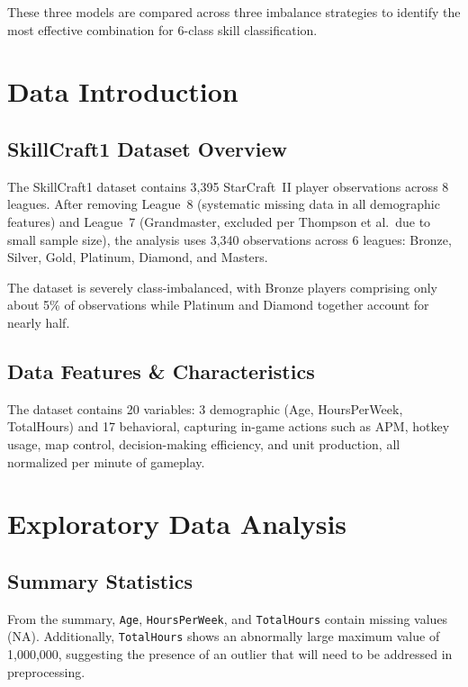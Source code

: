 \documentclass[12pt, a4paper]{article}
\begin{document}
These three models are compared across three imbalance strategies to identify the
most effective combination for 6-class skill classification.


\section{Data Introduction}

\subsection{SkillCraft1 Dataset Overview}

The SkillCraft1 dataset contains 3,395 StarCraft~II player observations across 8
leagues. After removing League~8 (systematic missing data in all demographic features)
and League~7 (Grandmaster, excluded per Thompson et al.\ due to small sample size),
the analysis uses 3,340 observations across 6 leagues: Bronze, Silver, Gold, Platinum,
Diamond, and Masters.

The dataset is severely class-imbalanced, with Bronze players comprising only about
5\% of observations while Platinum and Diamond together account for nearly half.

\subsection{Data Features \& Characteristics}

The dataset contains 20 variables: 3 demographic (Age, HoursPerWeek, TotalHours) and
17 behavioral, capturing in-game actions such as APM, hotkey usage, map control,
decision-making efficiency, and unit production, all normalized per minute of gameplay.


\section{Exploratory Data Analysis}

\subsection{Summary Statistics}

From the summary, \texttt{Age}, \texttt{HoursPerWeek}, and \texttt{TotalHours} contain
missing values (NA). Additionally, \texttt{TotalHours} shows an abnormally large maximum
value of 1,000,000, suggesting the presence of an outlier that will need to be addressed
in preprocessing.
\end{document}
